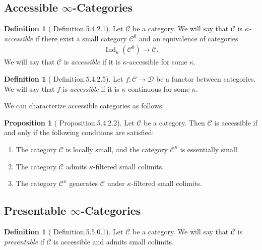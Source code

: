 \documentclass[a4paper,dvipdfmx,11pt,reqno]{amsart}
\DeclareMathOperator{\Ind}{Ind}
\newcommand{\C}{\mathcal{C}}
\newcommand{\D}{\mathcal{D}}
\theoremstyle{definition}
\newtheorem{definition}[theorem]{Definition}
\newtheorem{proposition}[theorem]{Proposition}
\begin{document}
\subsection{Accessible \texorpdfstring{$\infty$}{infty}-Categories}

\begin{definition}[\cite{HTT} Definition.5.4.2.1]
  Let $\C$ be a category.
  We will say that $\C$ is \textit{$\kappa$-accessible} if there exist a small category $\C^0$ and an equivalence of categories
  \begin{align*}
    \Ind_{\kappa}(\C^0) \to \C.
  \end{align*}
  We will say that $\C$ is \textit{accessible} if it is $\kappa$-accessible for some $\kappa$. 
\end{definition}

\begin{definition}[\cite{HTT} Definition.5.4.2.5]
  Let $f : \C \to \D$ be a functor between categories.
  We will say that $f$ is \textit{accessible} if it is $\kappa$-continuous for some $\kappa$.
\end{definition}

We can characterize accessible categories as follows:

\begin{proposition}[\cite{HTT} Proposition.5.4.2.2]
  Let $\C$ be a category.
  Then $\C$ is accessible if and only if the following conditions are satisfied:
  \begin{enumerate}
    \item The category $\C$ is locally small, and the category $\C^{\kappa}$ is essentially small.
    \item The category $\C$ admits $\kappa$-filtered small colimits.
    \item The category $\C^{\kappa}$ generates $\C$ under $\kappa$-filtered small colimits.
  \end{enumerate}
\end{proposition}

\subsection{Presentable \texorpdfstring{$\infty$}{infty}-Categories}

\begin{definition}[\cite{HTT} Definition.5.5.0.1]
  Let $\C$ be a category.
  We will say that $\C$ is \textit{presentable} if $\C$ is accessible and admits small colimits.
\end{definition}
\end{document}

